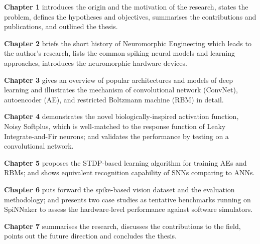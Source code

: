 \textbf{Chapter 1} introduces the origin and the motivation of the research, states the problem, defines the hypotheses and objectives, summarises the contributions and publications, and outlined the thesis. 

\textbf{Chapter 2} briefs the short history of Neuromorphic Engineering which leads to the author's research, lists the common spiking neural models and learning approaches, introduces the neuromorphic hardware devices.

\textbf{Chapter 3} gives an overview of popular architectures and models of deep learning and illustrates the mechanism of convolutional network (ConvNet), autoencoder (AE), and restricted Boltzmann machine (RBM) in detail.

\textbf{Chapter 4} demonstrates the novel biologically-inspired activation function, Noisy Softplus, which is well-matched to the response function of Leaky Integrate-and-Fir neurons; and validates the performance by testing on a convolutional network.

\textbf{Chapter 5} proposes the STDP-based learning algorithm for training AEs and RBMs; and shows equivalent recognition capability of SNNs comparing to ANNs.

\textbf{Chapter 6} puts forward the spike-based vision dataset and the evaluation methodology; and presents two case studies as tentative benchmarks running on SpiNNaker to assess the hardware-level performance against software simulators.

\textbf{Chapter 7} summarises the research, discusses the contributions to the field, points out the future direction and concludes the thesis.



